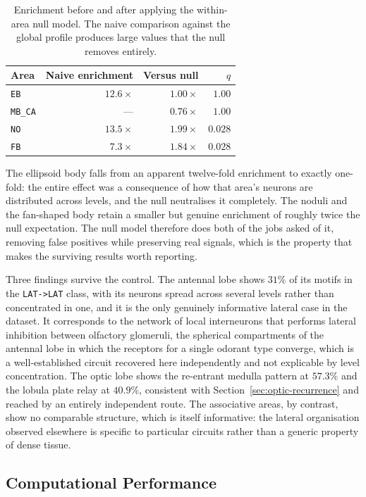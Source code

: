 \documentclass[12pt,a4paper,oneside]{article}
\theoremstyle{definition}
\theoremstyle{plain}
\newcommand{\code}[1]{\texttt{#1}}
\begin{document}
\begin{table}[H]
\centering
\caption{Enrichment before and after applying the within-area null model.
The naive comparison against the global profile produces large values that
the null removes entirely.}
\label{tab:within-null}
\begin{tabular}{lrrr}
\toprule
Area & Naive enrichment & Versus null & $q$ \\
\midrule
\code{EB} & $12.6\times$ & $\mathbf{1.00\times}$ & $1.00$ \\
\code{MB\_CA} & --- & $0.76\times$ & $1.00$ \\
\code{NO} & $13.5\times$ & $1.99\times$ & $0.028$ \\
\code{FB} & $7.3\times$  & $1.84\times$ & $0.028$ \\
\bottomrule
\end{tabular}
\end{table}

The ellipsoid body falls from an apparent twelve-fold enrichment to exactly
one-fold: the entire effect was a consequence of how that area's neurons are
distributed across levels, and the null neutralises it completely. The
noduli and the fan-shaped body retain a smaller but genuine enrichment of
roughly twice the null expectation. The null model therefore does both of
the jobs asked of it, removing false positives while preserving real
signals, which is the property that makes the surviving results worth
reporting.

Three findings survive the control. The antennal lobe shows $31\%$ of its
motifs in the \code{LAT->LAT} class, with its neurons spread across several
levels rather than concentrated in one, and it is the only genuinely
informative lateral case in the dataset. It corresponds to the network of
local interneurons that performs lateral inhibition between olfactory
glomeruli, the spherical compartments of the antennal lobe in which the
receptors for a single odorant type converge, which is a well-established circuit recovered here independently
and not explicable by level concentration. The optic lobe shows the
re-entrant medulla pattern at $57.3\%$ and the lobula plate relay at
$40.9\%$, consistent with Section~\ref{sec:optic-recurrence} and reached by
an entirely independent route. The associative areas, by contrast, show no
comparable structure, which is itself informative: the lateral organisation
observed elsewhere is specific to particular circuits rather than a generic
property of dense tissue.

\subsection{Computational Performance}
\label{sec:results-performance}
\end{document}
